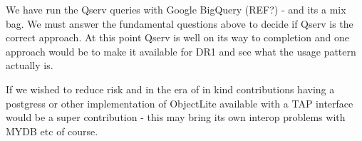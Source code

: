 We have run the Qserv queries with Google BigQuery  (REF?)  - and its a mix bag. We must answer the fundamental questions above to decide if Qserv  is the correct approach. At this point Qserv is well on its way to completion and one approach would be to make it available for DR1 and see what the usage pattern actually is.

If we wished to reduce risk and in the era of in kind contributions having a postgress or other implementation of ObjectLite available with a TAP interface would be a super contribution - this may bring its own interop problems with MYDB etc of course.

